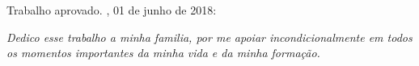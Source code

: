 \documentclass[12pt,	openright, twoside,	a4paper, english, french, spanish, brazil]{abntex2}
\begin{document}
%
% 
%
\begin{folhadeaprovacao}

  \begin{center}
    {\ABNTEXchapterfont\large\imprimirautor}

    \vspace*{\fill}\vspace*{\fill}
    \begin{center}
      \ABNTEXchapterfont\bfseries\Large\imprimirtitulo
    \end{center}
    \vspace*{\fill}
    
    \hspace{.45\textwidth}
    \begin{minipage}{.5\textwidth}
        \imprimirpreambulo
    \end{minipage}%
    \vspace*{\fill}
   \end{center}
        
   Trabalho aprovado. \imprimirlocal, 01 de junho de 2018:

      
   \begin{center}
    \vspace*{0.5cm}
    {\large\imprimirlocal}
    \par
    {\large\imprimirdata}
    \vspace*{1cm}
  \end{center}
  
\end{folhadeaprovacao}

\begin{dedicatoria}
   \vspace*{\fill}
   \centering
   \noindent
   \textit{ Dedico esse trabalho a minha familia, por me apoiar incondicionalmente em todos os momentos importantes da minha vida e da minha formação.} \vspace*{\fill}
\end{dedicatoria}
\end{document}
